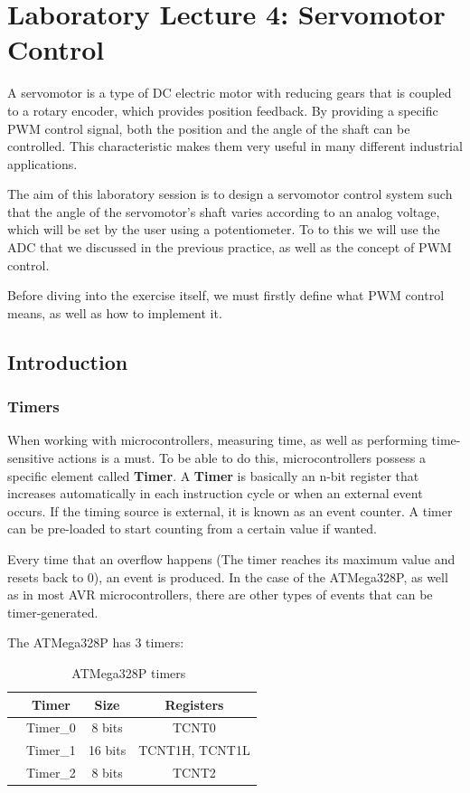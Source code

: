 \section{Laboratory Lecture 4: Servomotor Control}

A servomotor is a type of DC electric motor with reducing gears that is coupled to a rotary encoder, which provides position feedback. By providing a specific PWM control signal, both the position and the angle of the shaft can be controlled. This characteristic makes them very useful in many different industrial applications.\medskip

The aim of this laboratory session is to design a servomotor control system such that the angle of the servomotor's shaft varies according to an analog voltage, which will be set by the user using a potentiometer. To to this we will use the ADC that we discussed in the previous practice, as well as the concept of PWM control.\medskip

Before diving into the exercise itself, we must firstly define what PWM control means, as well as how to implement it.

\subsection{Introduction}

\subsubsection{Timers}

When working with microcontrollers, measuring time, as well as performing time-sensitive actions is a must. To be able to do this, microcontrollers possess a specific element called \textbf{Timer}. A \textbf{Timer} is basically an n-bit register that increases automatically in each instruction cycle or when an external event occurs. If the timing source is external, it is known as an event counter. A timer can be pre-loaded to start counting from a certain value if wanted.\medskip

Every time that an overflow happens (The timer reaches its maximum value and resets back to 0), an event is produced. In the case of the ATMega328P, as well as in most AVR microcontrollers, there are other types of events that can be timer-generated.\medskip

The ATMega328P has 3 timers:

\begin{table}[H]
    \centering
    \begin{tabular}[t]{lccc}
        \toprule
        & \textbf{Timer} & \textbf{Size} & \textbf{Registers} \\
        \midrule
        & Timer\_0 & 8 bits  & TCNT0          \\
        & Timer\_1 & 16 bits & TCNT1H, TCNT1L \\
        & Timer\_2 & 8 bits  & TCNT2          \\
        \bottomrule
    \end{tabular}
    \caption{ATMega328P timers~\autocite{ATMEGA328P}}
    \label{table:ATMEGA_TIMERS}
\end{table}

